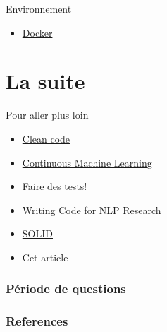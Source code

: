 \documentclass[aspectratio=169,10pt,xcolor=x11names,english,french]{beamer}
\begin{document}
	\begin{frame}{Environnement}
		\begin{itemize}
			\item \href{https://www.docker.com/}{Docker}
		\end{itemize}
	\end{frame}
		
	\section{La suite}
	\centering
	\begin{frame}
		\fontsize{35}{35}\selectfont\textcolor[cmyk]{0.67, 0.66, 0, 0.71}\faRefresh
	\end{frame}
	
	\begin{frame}{Pour aller plus loin}
		\begin{itemize}
			\item \href{https://www.oreilly.com/library/view/clean-code-a/9780136083238/}{Clean code}
			\item \href{https://github.com/iterative/cml}{Continuous Machine Learning}
			\item Faire des tests!
			\item Writing Code for NLP Research \cite{gardner-etal-2018-writing}
			\item \href{https://www.youtube.com/watch?v=t86v3N4OshQ&list=LLFp5G_2HoipBrGaw9iAcPPw&index=693}{SOLID}
			\item Cet article \cite{pineau2020improving}
		\end{itemize}
	\end{frame}
	
	\begin{frame}
		\frametitle{Période de questions}
		
		\centering
		\fontsize{100}{100}\selectfont\textcolor[cmyk]{0.67, 0.66, 0, 0.71}
		\faQuestion
		
	\end{frame}

	
	
	\begin{frame}[t, allowframebreaks]
		\frametitle{References}
		
		
	\end{frame}
	
	
	
\end{document}
